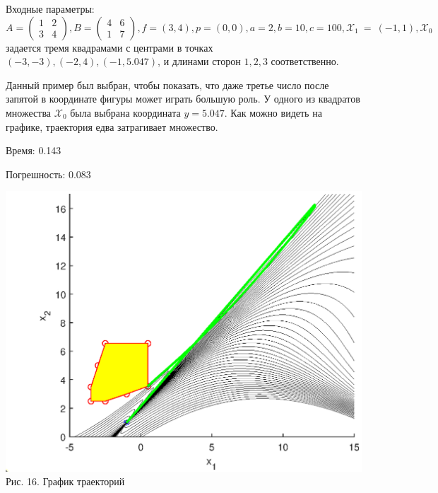 \documentclass{article}
\theoremstyle{definition}
\begin{document}
Входные параметры: $A = \begin{pmatrix} 1 & 2 \\ 3 & 4\end{pmatrix}, B = \begin{pmatrix} 4 & 6 \\ 1 & 7\end{pmatrix}, 
f = (3, 4), p = (0,0), a = 2, b = 10, c = 100, \mathcal{X}_1~=~(-1,1), \mathcal{X}_0$
 задается тремя квадрамами с центрами в точках $(-3, -3), (-2,4), (-1,5.047)$,
и длинами сторон $1, 2, 3$ соответственно.

Данный пример был выбран, чтобы показать, что даже третье число после запятой в координате фигуры может играть большую роль.
У одного из квадратов множества $\mathcal{X}_0$ была выбрана координата $y = 5.047$.
Как можно видеть на графике, траектория едва затрагивает множество.

Время: 0.143

Погрешность: 0.083

\begin{center}
{\includegraphics[width=15cm]{example6.eps}}
{Рис. 16. График траекторий}
\end{center}
\end{document}
